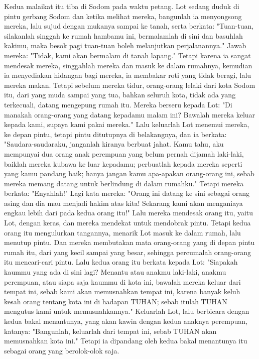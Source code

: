 \begin{biblechapter} %
 Kedua malaikat itu tiba di Sodom pada waktu petang. Lot sedang duduk di pintu gerbang Sodom dan ketika melihat mereka, bangunlah ia menyongsong mereka, lalu sujud dengan mukanya sampai ke tanah,
\verse serta berkata: "Tuan-tuan, silakanlah singgah ke rumah hambamu ini, bermalamlah di sini dan basuhlah kakimu, maka besok pagi tuan-tuan boleh melanjutkan perjalanannya." Jawab mereka: "Tidak, kami akan bermalam di tanah lapang."
\verse Tetapi karena ia sangat mendesak mereka, singgahlah mereka dan masuk ke dalam rumahnya, kemudian ia menyediakan hidangan bagi mereka, ia membakar roti yang tidak beragi, lalu mereka makan.
\verse Tetapi sebelum mereka tidur, orang-orang lelaki dari kota Sodom itu, dari yang muda sampai yang tua, bahkan seluruh kota, tidak ada yang terkecuali, datang mengepung rumah itu.
\verse Mereka berseru kepada Lot: "Di manakah orang-orang yang datang kepadamu malam ini? Bawalah mereka keluar kepada kami, supaya kami pakai mereka."
\verse Lalu keluarlah Lot menemui mereka, ke depan pintu, tetapi pintu ditutupnya di belakangnya,
\verse dan ia berkata: "Saudara-saudaraku, janganlah kiranya berbuat jahat.
\verse Kamu tahu, aku mempunyai dua orang anak perempuan yang belum pernah dijamah laki-laki, baiklah mereka kubawa ke luar kepadamu; perbuatlah kepada mereka seperti yang kamu pandang baik; hanya jangan kamu apa-apakan orang-orang ini, sebab mereka memang datang untuk berlindung di dalam rumahku."
\verse Tetapi mereka berkata: "Enyahlah!" Lagi kata mereka: "Orang ini datang ke sini sebagai orang asing dan dia mau menjadi hakim atas kita! Sekarang kami akan menganiaya engkau lebih dari pada kedua orang itu!" Lalu mereka mendesak orang itu, yaitu Lot, dengan keras, dan mereka mendekat untuk mendobrak pintu.
\verse Tetapi kedua orang itu mengulurkan tangannya, menarik Lot masuk ke dalam rumah, lalu menutup pintu.
\verse Dan mereka membutakan mata orang-orang yang di depan pintu rumah itu, dari yang kecil sampai yang besar, sehingga percumalah orang-orang itu mencari-cari pintu.
\verse Lalu kedua orang itu berkata kepada Lot: "Siapakah kaummu yang ada di sini lagi? Menantu atau anakmu laki-laki, anakmu perempuan, atau siapa saja kaummu di kota ini, bawalah mereka keluar dari tempat ini,
\verse sebab kami akan memusnahkan tempat ini, karena banyak keluh kesah orang tentang kota ini di hadapan TUHAN; sebab itulah TUHAN mengutus kami untuk memusnahkannya."
\verse Keluarlah Lot, lalu berbicara dengan kedua bakal menantunya, yang akan kawin dengan kedua anaknya perempuan, katanya: "Bangunlah, keluarlah dari tempat ini, sebab TUHAN akan memusnahkan kota ini." Tetapi ia dipandang oleh kedua bakal menantunya itu sebagai orang yang berolok-olok saja.

\end{biblechapter}
